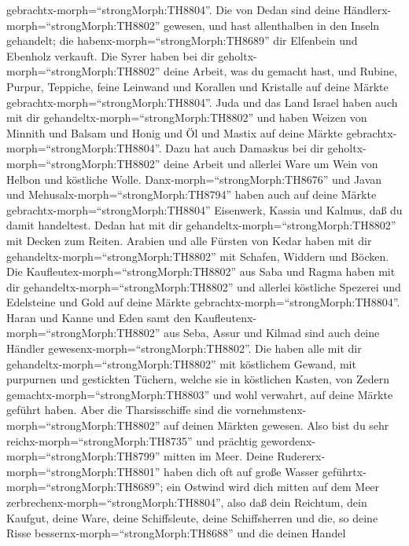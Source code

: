 gebrachtx-morph=``strongMorph:TH8804''.  Die von Dedan sind
deine Händlerx-morph=``strongMorph:TH8802'' gewesen, und hast
allenthalben in den Inseln gehandelt; die
habenx-morph=``strongMorph:TH8689'' dir Elfenbein und Ebenholz verkauft.
 Die Syrer haben bei dir
geholtx-morph=``strongMorph:TH8802'' deine Arbeit, was du gemacht hast,
und Rubine, Purpur, Teppiche, feine Leinwand und Korallen und Kristalle
auf deine Märkte gebrachtx-morph=``strongMorph:TH8804''. 
Juda und das Land Israel haben auch mit dir
gehandeltx-morph=``strongMorph:TH8802'' und haben Weizen von Minnith und
Balsam und Honig und Öl und Mastix auf deine Märkte
gebrachtx-morph=``strongMorph:TH8804''.  Dazu hat auch
Damaskus bei dir geholtx-morph=``strongMorph:TH8802'' deine Arbeit und
allerlei Ware um Wein von Helbon und köstliche Wolle. 
Danx-morph=``strongMorph:TH8676'' und Javan und
Mehusalx-morph=``strongMorph:TH8794'' haben auch auf deine Märkte
gebrachtx-morph=``strongMorph:TH8804'' Eisenwerk, Kassia und Kalmus, daß
du damit handeltest.  Dedan hat mit dir
gehandeltx-morph=``strongMorph:TH8802'' mit Decken zum Reiten.
 Arabien und alle Fürsten von Kedar haben mit dir
gehandeltx-morph=``strongMorph:TH8802'' mit Schafen, Widdern und Böcken.
 Die Kaufleutex-morph=``strongMorph:TH8802'' aus Saba und
Ragma haben mit dir gehandeltx-morph=``strongMorph:TH8802'' und allerlei
köstliche Spezerei und Edelsteine und Gold auf deine Märkte
gebrachtx-morph=``strongMorph:TH8804''.  Haran und Kanne
und Eden samt den Kaufleutenx-morph=``strongMorph:TH8802'' aus Seba,
Assur und Kilmad sind auch deine Händler
gewesenx-morph=``strongMorph:TH8802''.  Die haben alle mit
dir gehandeltx-morph=``strongMorph:TH8802'' mit köstlichem Gewand, mit
purpurnen und gestickten Tüchern, welche sie in köstlichen Kasten, von
Zedern gemachtx-morph=``strongMorph:TH8803'' und wohl verwahrt, auf
deine Märkte geführt haben.  Aber die Tharsisschiffe sind
die vornehmstenx-morph=``strongMorph:TH8802'' auf deinen Märkten
gewesen. Also bist du sehr reichx-morph=``strongMorph:TH8735'' und
prächtig gewordenx-morph=``strongMorph:TH8799'' mitten im Meer.
 Deine Rudererx-morph=``strongMorph:TH8801'' haben dich oft
auf große Wasser geführtx-morph=``strongMorph:TH8689''; ein Ostwind wird
dich mitten auf dem Meer zerbrechenx-morph=``strongMorph:TH8804'',
 also daß dein Reichtum, dein Kaufgut, deine Ware, deine
Schiffsleute, deine Schiffsherren und die, so deine Risse
bessernx-morph=``strongMorph:TH8688'' und die deinen Handel
